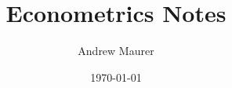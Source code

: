 \documentclass[12pt,reqno]{amsart}
\begin{document}
\title{Econometrics Notes}
\author{Andrew Maurer}
\date{\today}

\begin{abstract}

\end{abstract}

\maketitle

\begin{center}
  \parbox{4.7in}{
    \tableofcontents
    }
\end{center}



\appendix
\end{document}
